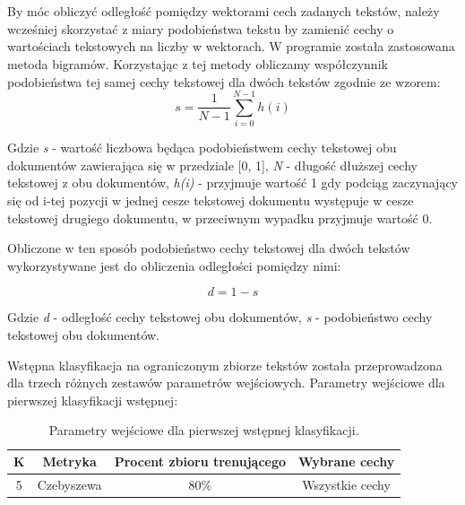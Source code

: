 \documentclass{classrep}
\begin{document}
\\\\
By móc obliczyć odległość pomiędzy wektorami cech zadanych tekstów, należy wcześniej skorzystać z miary podobieństwa tekstu by zamienić cechy o wartościach tekstowych na liczby w wektorach. W programie została zastosowana metoda bigramów\cite{wyklad}. Korzystając z tej metody obliczamy współczynnik podobieństwa tej samej cechy tekstowej dla dwóch tekstów zgodnie ze wzorem:
\begin{equation}\label{eqn:pod} s = \frac {1}{N - 1}  \sum_{i = 0}^{N-1}h(i) \end{equation}

Gdzie \textit{s} - wartość liczbowa będąca podobieństwem cechy tekstowej obu dokumentów zawierająca się w przedziale [0, 1], \textit{N} - długość dłuższej cechy tekstowej z obu dokumentów, \textit{h(i)} - przyjmuje wartość 1 gdy podciąg zaczynający się od i-tej pozycji w jednej cesze tekstowej dokumentu występuje w cesze tekstowej drugiego dokumentu, w przeciwnym wypadku przyjmuje wartość 0.
\newline

Obliczone w ten sposób podobieństwo cechy tekstowej dla dwóch tekstów wykorzystywane jest do obliczenia odległości pomiędzy nimi:

\begin{equation}\label{eqn:odl}d = 1 - s \end{equation}

Gdzie \textit{d} - odległość cechy tekstowej obu dokumentów, \textit{s} - podobieństwo cechy tekstowej obu dokumentów.\\
\newline





Wstępna klasyfikacja na ograniczonym zbiorze tekstów została przeprowadzona dla trzech różnych zestawów parametrów wejściowych. \newline
Parametry wejściowe dla pierwszej klasyfikacji wstępnej:
 
\begin{table}[h!]
\caption{Parametry wejściowe dla pierwszej wstępnej klasyfikacji. }
\centering
\vspace{0.1cm}
 \begin{tabular}{c c c c}
    \textbf{K} & \textbf{Metryka}   & \textbf{Procent zbioru trenującego}  & \textbf{Wybrane cechy}   \\
\hline
5 & Czebyszewa & 80\% & Wszystkie cechy \\
\end {tabular}
\label {Parametry wejściowe dla pierwszej wstępnej klasyfikacji. }
\end{table}
\newpage
\end{document}

